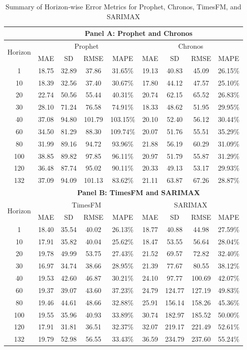 \begin{table}[htbp]
\centering
\caption{Summary of Horizon-wise Error Metrics for Prophet, Chronos, TimesFM, and SARIMAX}
\begin{tabular}{c|cccc|cccc}
\toprule
 & \multicolumn{8}{c}{\textbf{Panel A: Prophet and Chronos}} \\
\midrule
\multirow{2}{*}{Horizon} & \multicolumn{4}{c|}{Prophet} & \multicolumn{4}{c}{Chronos} \\
 & MAE & SD & RMSE & MAPE & MAE & SD & RMSE & MAPE \\
\midrule
1 & 18.75 & 32.89 & 37.86 & 31.65\% & 19.13 & 40.83 & 45.09 & 26.15\% \\
10 & 18.39 & 32.56 & 37.40 & 30.67\% & 17.80 & 44.12 & 47.57 & 25.10\% \\
20 & 22.74 & 50.56 & 55.44 & 40.31\% & 20.74 & 62.15 & 65.52 & 26.83\% \\
30 & 28.10 & 71.24 & 76.58 & 74.91\% & 18.33 & 48.62 & 51.95 & 29.95\% \\
40 & 37.08 & 94.80 & 101.79 & 103.15\% & 20.10 & 52.40 & 56.12 & 30.44\% \\
60 & 34.50 & 81.29 & 88.30 & 109.74\% & 20.07 & 51.76 & 55.51 & 35.29\% \\
80 & 31.99 & 89.16 & 94.72 & 93.96\% & 21.88 & 56.19 & 60.29 & 31.09\% \\
100 & 38.85 & 89.82 & 97.85 & 96.11\% & 20.97 & 51.79 & 55.87 & 31.29\% \\
120 & 36.48 & 87.74 & 95.02 & 90.11\% & 20.33 & 49.13 & 53.17 & 29.93\% \\
132 & 37.09 & 94.09 & 101.13 & 83.62\% & 21.11 & 63.87 & 67.26 & 28.87\% \\
\midrule\midrule
 & \multicolumn{8}{c}{\textbf{Panel B: TimesFM and SARIMAX}} \\
\midrule
\multirow{2}{*}{Horizon} & \multicolumn{4}{c|}{TimesFM} & \multicolumn{4}{c}{SARIMAX} \\
 & MAE & SD & RMSE & MAPE & MAE & SD & RMSE & MAPE \\
\midrule
1 & 18.40 & 35.54 & 40.02 & 26.13\% & 18.77 & 40.88 & 44.98 & 27.59\% \\
10 & 17.91 & 35.82 & 40.04 & 25.62\% & 18.47 & 53.55 & 56.64 & 28.04\% \\
20 & 19.78 & 49.99 & 53.75 & 27.43\% & 21.52 & 69.57 & 72.82 & 32.40\% \\
30 & 16.97 & 34.74 & 38.66 & 28.95\% & 21.39 & 77.67 & 80.55 & 38.12\% \\
40 & 19.53 & 42.60 & 46.87 & 30.21\% & 24.10 & 97.77 & 100.69 & 42.07\% \\
60 & 19.37 & 39.07 & 43.60 & 37.23\% & 24.79 & 124.77 & 127.19 & 49.83\% \\
80 & 19.46 & 44.61 & 48.66 & 32.88\% & 25.91 & 156.14 & 158.26 & 45.36\% \\
100 & 19.55 & 35.96 & 40.93 & 33.89\% & 30.74 & 182.97 & 185.52 & 50.00\% \\
120 & 17.91 & 31.81 & 36.51 & 32.37\% & 32.07 & 219.17 & 221.49 & 52.61\% \\
132 & 19.79 & 52.98 & 56.55 & 33.43\% & 36.59 & 234.79 & 237.60 & 55.24\% \\
\bottomrule
\end{tabular}
\end{table}
